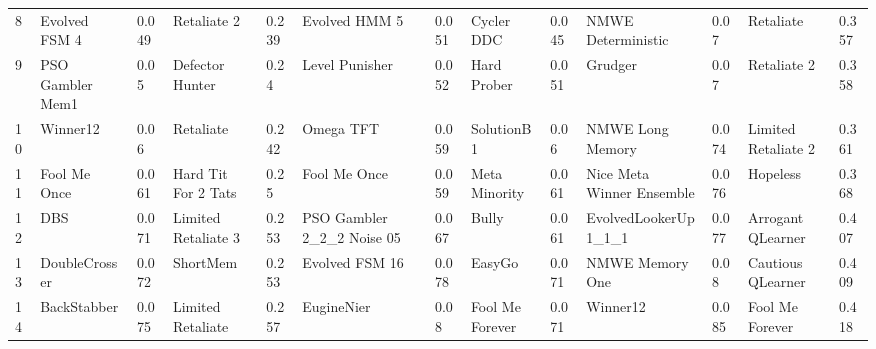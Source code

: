 \begin{tabular}{lllllllllllll}
8  &            Evolved FSM 4 &     0.049 &            Retaliate 2 &     0.239 &               Evolved HMM 5 &     0.051 &         Cycler DDC &     0.045 &         NMWE Deterministic &      0.07 &            Retaliate &     0.357 \\
9  &         PSO Gambler Mem1 &      0.05 &        Defector Hunter &      0.24 &              Level Punisher &     0.052 &        Hard Prober &     0.051 &                    Grudger &      0.07 &          Retaliate 2 &     0.358 \\
10 &                 Winner12 &      0.06 &              Retaliate &     0.242 &                   Omega TFT &     0.059 &         SolutionB1 &      0.06 &           NMWE Long Memory &     0.074 &  Limited Retaliate 2 &     0.361 \\
11 &             Fool Me Once &     0.061 &    Hard Tit For 2 Tats &      0.25 &                Fool Me Once &     0.059 &      Meta Minority &     0.061 &  Nice Meta Winner Ensemble &     0.076 &             Hopeless &     0.368 \\
12 &                      DBS &     0.071 &    Limited Retaliate 3 &     0.253 &  PSO Gambler 2\_2\_2 Noise 05 &     0.067 &              Bully &     0.061 &       EvolvedLookerUp1\_1\_1 &     0.077 &    Arrogant QLearner &     0.407 \\
13 &            DoubleCrosser &     0.072 &               ShortMem &     0.253 &              Evolved FSM 16 &     0.078 &             EasyGo &     0.071 &            NMWE Memory One &      0.08 &    Cautious QLearner &     0.409 \\
14 &              BackStabber &     0.075 &      Limited Retaliate &     0.257 &                  EugineNier &      0.08 &    Fool Me Forever &     0.071 &                   Winner12 &     0.085 &      Fool Me Forever &     0.418 \\
\bottomrule
\end{tabular}
